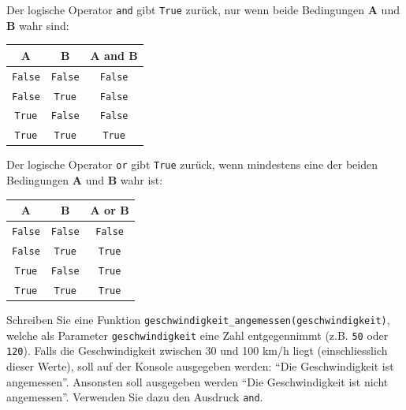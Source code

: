\begin{mydefinition}

Der logische Operator \lstinline|and| gibt \lstinline|True| zurück, nur wenn beide Bedingungen \textbf{A} und \textbf{B} wahr sind:

\begin{table}[H]
	\centering
	\begin{tabular}{c|c||c}
		\textbf{A} & \textbf{B} & \textbf{A and B} \\\midrule
		\lstinline|False| & \lstinline|False| & \lstinline|False| \\
		\lstinline|False| & \lstinline|True| & \lstinline|False| \\
		\lstinline|True| & \lstinline|False| & \lstinline|False| \\
		\lstinline|True| & \lstinline|True| & \lstinline|True|
	\end{tabular}
\end{table}
\end{mydefinition}

\begin{mydefinition}

Der logische Operator \lstinline|or| gibt \lstinline|True| zurück, wenn mindestens eine der beiden Bedingungen \textbf{A} und \textbf{B} wahr ist:

\begin{table}[H]
	\centering
	\begin{tabular}{c|c||c}
		\textbf{A} & \textbf{B} & \textbf{A or B} \\\midrule
		\lstinline|False| & \lstinline|False| & \lstinline|False| \\
		\lstinline|False| & \lstinline|True| & \lstinline|True| \\
		\lstinline|True| & \lstinline|False| & \lstinline|True| \\
		\lstinline|True| & \lstinline|True| & \lstinline|True|
	\end{tabular}
\end{table}
\end{mydefinition}

\begin{myexercise}\label{ex:geschwindigkeitAngemessen}
	Schreiben Sie eine Funktion \lstinline|geschwindigkeit_angemessen(geschwindigkeit)|, welche als Parameter \lstinline|geschwindigkeit| eine Zahl entgegennimmt (z.B. \lstinline|50| oder \lstinline|120|). Falls die Geschwindigkeit zwischen 30 und 100 km/h liegt (einschliesslich dieser Werte), soll auf der Konsole ausgegeben werden: \enquote{Die Geschwindigkeit ist angemessen}. Ansonsten soll ausgegeben werden \enquote{Die Geschwindigkeit ist nicht angemessen}. Verwenden Sie dazu den Ausdruck \lstinline|and|.
	\begin{myanswer}
		
	\end{myanswer}
\end{myexercise}


